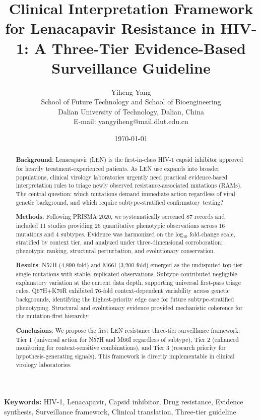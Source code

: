 \documentclass[12pt,a4paper]{article}
\title{Clinical Interpretation Framework for Lenacapavir Resistance in HIV-1: A Three-Tier Evidence-Based Surveillance Guideline}
\author{Yiheng Yang\\
School of Future Technology and School of Bioengineering\\
Dalian University of Technology, Dalian, China\\
E-mail: yangyiheng@mail.dlut.edu.cn}
\date{\today}
\begin{document}
\maketitle

\begin{abstract}
\textbf{Background}: Lenacapavir (LEN) is the first-in-class HIV-1 capsid inhibitor approved for heavily treatment-experienced patients. As LEN use expands into broader populations, clinical virology laboratories urgently need practical evidence-based interpretation rules to triage newly observed resistance-associated mutations (RAMs). The central question: which mutations demand immediate action regardless of viral genetic background, and which require subtype-stratified confirmatory testing?

\textbf{Methods}: Following PRISMA 2020, we systematically screened 87 records and included 11 studies providing 26 quantitative phenotypic observations across 16 mutations and 4 subtypes. Evidence was harmonized on the log$_{10}$ fold-change scale, stratified by context tier, and analyzed under three-dimensional corroboration: phenotypic ranking, structural perturbation, and evolutionary conservation.

\textbf{Results}: N57H (4,890-fold) and M66I (3,200-fold) emerged as the undisputed top-tier single mutations with stable, replicated observations. Subtype contributed negligible explanatory variation at the current data depth, supporting universal first-pass triage rules. Q67H+K70R exhibited 76-fold context-dependent variability across genetic backgrounds, identifying the highest-priority edge case for future subtype-stratified phenotyping. Structural and evolutionary evidence provided mechanistic coherence for the mutation-first hierarchy.

\textbf{Conclusions}: We propose the first LEN resistance three-tier surveillance framework: Tier 1 (universal action for N57H and M66I regardless of subtype), Tier 2 (enhanced monitoring for context-sensitive combinations), and Tier 3 (research priority for hypothesis-generating signals). This framework is directly implementable in clinical virology laboratories.
\end{abstract}

\textbf{Keywords:} HIV-1, Lenacapavir, Capsid inhibitor, Drug resistance, Evidence synthesis, Surveillance framework, Clinical translation, Three-tier guideline

\linenumbers

\end{document}
